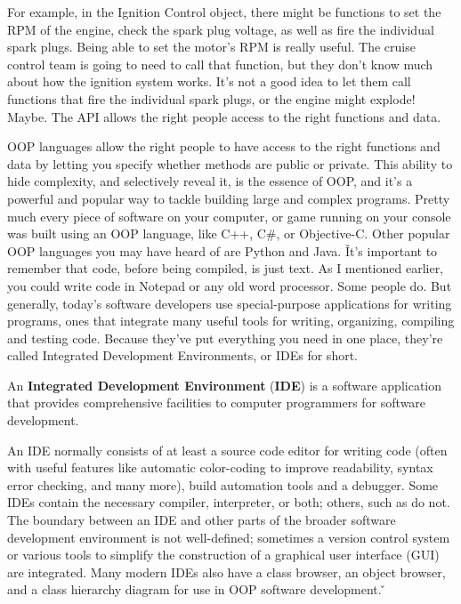 \be
For example, in the Ignition Control object, there might be functions to set the RPM of the engine, check the spark
plug voltage, as well as fire the individual spark plugs. Being able to set the motor's RPM is really useful. The
cruise control team is going to need to call that function, but they don't know much about how the ignition system
works. It's not a good idea to let them call functions that fire the individual spark plugs, or the engine might
explode! Maybe. The API allows the right people access to the right functions and data.
\ee

OOP languages allow the right people to have access to the right functions and data by letting you specify whether
methods are public or private. This ability to hide complexity, and selectively reveal it,  is the essence of OOP,
and it's a powerful and popular way to tackle building large and complex programs. Pretty much every piece of
software on your computer, or game running on your console was built using an OOP language, like C++, C\#, or
Objective-C. Other popular OOP languages you may have heard of are Python and Java. \v

It's important to remember that code, before being compiled, is just text. As I mentioned earlier, you could write
code in Notepad or any old word processor. Some people do. But generally, today's software developers use
special-purpose applications for writing programs, ones that integrate many useful tools for writing, organizing,
compiling and testing code. Because they've put everything you need in one place, they're called Integrated Development
Environments, or IDEs for short.

An \textbf{Integrated Development Environment} (\textbf{IDE}) is a software application that provides comprehensive
facilities to computer programmers for software development.
\ed

An IDE normally consists of at least a source code editor for writing code (often with useful features like automatic
color-coding to improve readability, syntax error checking, and many more), build automation tools and a debugger.
Some IDEs contain the necessary compiler, interpreter, or both; others, such as do not. The boundary between an IDE and
other parts of the broader software development environment is not well-defined; sometimes a version control system or
various tools to simplify the construction of a graphical user interface (GUI) are integrated. Many modern IDEs also
have a class browser, an object browser, and a class hierarchy diagram for use in OOP software development. \v

